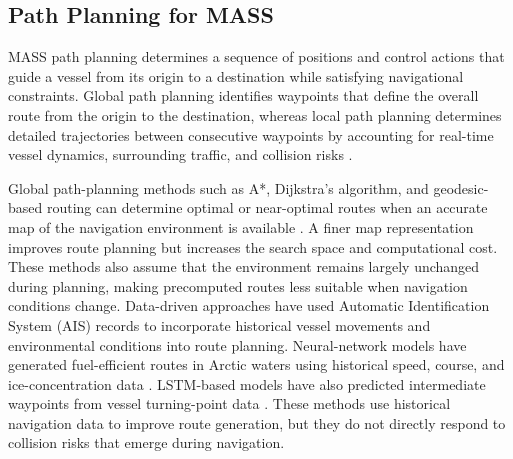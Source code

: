 \documentclass[final,5p,times,twocolumn]{elsarticle}
\begin{document}
\subsection{Path Planning for MASS}
{\color{violet}
MASS path planning determines a sequence of positions and control actions that guide a vessel from its origin to a destination while satisfying navigational constraints. Global path planning identifies waypoints that define the overall route from the origin to the destination, whereas local path planning determines detailed trajectories between consecutive waypoints by accounting for real-time vessel dynamics, surrounding traffic, and collision risks \citep{Yuan}.

Global path-planning methods such as A*, Dijkstra's algorithm, and geodesic-based routing can determine optimal or near-optimal routes when an accurate map of the navigation environment is available \citep{58}. A finer map representation improves route planning but increases the search space and computational cost. These methods also assume that the environment remains largely unchanged during planning, making precomputed routes less suitable when navigation conditions change. Data-driven approaches have used Automatic Identification System (AIS) records to incorporate historical vessel movements and environmental conditions into route planning. Neural-network models have generated fuel-efficient routes in Arctic waters using historical speed, course, and ice-concentration data \citep{119}. LSTM-based models have also predicted intermediate waypoints from vessel turning-point data \citep{120}. These methods use historical navigation data to improve route generation, but they do not directly respond to collision risks that emerge during navigation.

}
\end{document}
